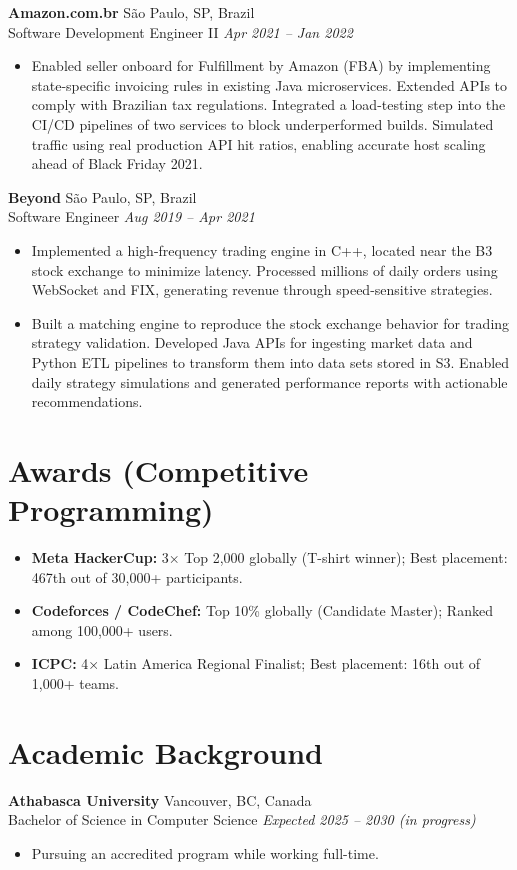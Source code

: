 \documentclass[a4paper,10pt]{article}
\begin{document}
\textbf{Amazon.com.br}
    \hfill São Paulo, SP, Brazil 
    \\ Software Development Engineer II 
    \hfill \textit{Apr 2021 – Jan 2022}
\begin{itemize}
    \item Enabled seller onboard for Fulfillment by Amazon (FBA) by implementing state-specific invoicing rules in existing Java microservices. Extended APIs to comply with Brazilian tax regulations. Integrated a load-testing step into the CI/CD pipelines of two services to block underperformed builds. Simulated traffic using real production API hit ratios, enabling accurate host scaling ahead of Black Friday 2021.
\end{itemize}

\textbf{Beyond}
    \hfill São Paulo, SP, Brazil 
    \\ Software Engineer
    \hfill \textit{Aug 2019 – Apr 2021}
\begin{itemize}
    \item Implemented a high-frequency trading engine in C++, located near the B3 stock exchange to minimize latency. Processed millions of daily orders using WebSocket and FIX, generating revenue through speed-sensitive strategies.
    \item Built a matching engine to reproduce the stock exchange behavior for trading strategy validation. Developed Java APIs for ingesting market data and Python ETL pipelines to transform them into data sets stored in S3. Enabled daily strategy simulations and generated performance reports with actionable recommendations.
\end{itemize}

\section*{Awards (Competitive Programming)}
\begin{itemize}
    \item \textbf{Meta HackerCup:} 3× Top 2,000 globally (T-shirt winner); Best placement: 467th out of 30,000+ participants.
    \item \textbf{Codeforces / CodeChef:} Top 10\% globally (Candidate Master); Ranked among 100,000+ users.
    \item \textbf{ICPC:} 4× Latin America Regional Finalist; Best placement: 16th out of 1,000+ teams.
\end{itemize}

\section*{Academic Background}

\textbf{Athabasca University} 
    \hfill Vancouver, BC, Canada
    \\Bachelor of Science in Computer Science
    \hfill \textit{Expected 2025 – 2030 (in progress)}
\begin{itemize}
    \item Pursuing an accredited program while working full-time.
\end{itemize}
\end{document}

